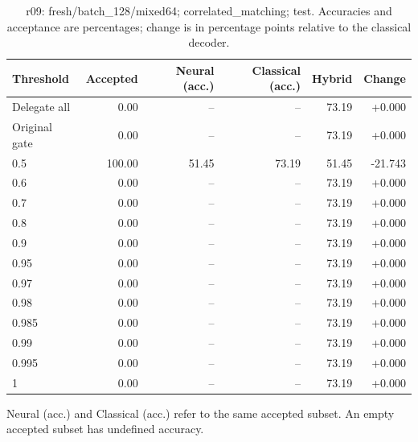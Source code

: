 \begin{table}[htbp]
\centering\small
\setlength{\tabcolsep}{3pt}
\caption{r09: fresh/batch\_128/mixed64; correlated\_matching; test. Accuracies and acceptance are percentages; change is in percentage points relative to the classical decoder.}
\begin{tabular}{lrrrrr}
\toprule
Threshold & Accepted & Neural (acc.) & Classical (acc.) & Hybrid & Change \\
\midrule
Delegate all & 0.00 & -- & -- & 73.19 & +0.000 \\
Original gate & 0.00 & -- & -- & 73.19 & +0.000 \\
0.5 & 100.00 & 51.45 & 73.19 & 51.45 & -21.743 \\
0.6 & 0.00 & -- & -- & 73.19 & +0.000 \\
0.7 & 0.00 & -- & -- & 73.19 & +0.000 \\
0.8 & 0.00 & -- & -- & 73.19 & +0.000 \\
0.9 & 0.00 & -- & -- & 73.19 & +0.000 \\
0.95 & 0.00 & -- & -- & 73.19 & +0.000 \\
0.97 & 0.00 & -- & -- & 73.19 & +0.000 \\
0.98 & 0.00 & -- & -- & 73.19 & +0.000 \\
0.985 & 0.00 & -- & -- & 73.19 & +0.000 \\
0.99 & 0.00 & -- & -- & 73.19 & +0.000 \\
0.995 & 0.00 & -- & -- & 73.19 & +0.000 \\
1 & 0.00 & -- & -- & 73.19 & +0.000 \\
\bottomrule
\end{tabular}
\par\smallskip\footnotesize Neural (acc.) and Classical (acc.) refer to the same accepted subset. An empty accepted subset has undefined accuracy.
\end{table}
